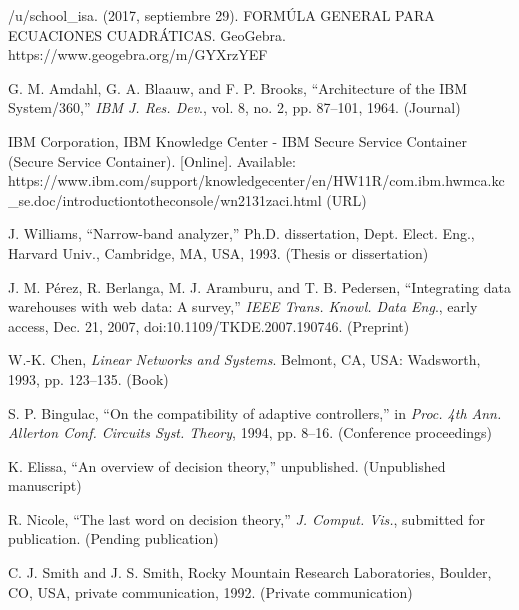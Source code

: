 \documentclass{IEEEcsmag}
\begin{document}
\begin{thebibliography}{1}

/u/school_isa. (2017, septiembre 29). FORMÚLA GENERAL PARA ECUACIONES CUADRÁTICAS. GeoGebra. https://www.geogebra.org/m/GYXrzYEF

G. M. Amdahl, G. A. Blaauw, and F. P. Brooks, ``Architecture of the IBM System/360,'' {\it IBM J. Res. Dev}., vol. 8, no. 2, pp. 87--101, 1964. (Journal)

IBM Corporation, IBM Knowledge Center - IBM Secure Service Container (Secure Service Container). [Online]. Available: {https://www.ibm.com/support/\break knowledgecenter/en/HW11R/com.ibm.hwmca.kc\_se.doc/\break introductiontotheconsole/wn2131zaci.html} (URL)

J. Williams, ``Narrow-band analyzer,'' Ph.D. dissertation, Dept.  Elect. Eng., Harvard Univ., Cambridge, MA, USA, 1993. (Thesis or dissertation)

J. M. P\'erez, R. Berlanga, M. J. Aramburu, and T. B. Pedersen, ``Integrating data warehouses with web data: A survey,'' {\it IEEE Trans. Knowl. Data Eng}., early access, Dec. 21, 2007, doi:10.1109/TKDE.2007.190746. (Preprint)

W.-K. Chen, {\it Linear Networks and Systems}. Belmont, CA, USA: Wadsworth,  1993, pp. 123--135. (Book)

S. P. Bingulac, ``On the compatibility of adaptive controllers,'' in {\it Proc. 4th Ann. Allerton Conf. Circuits Syst. Theory}, 1994,  pp. 8--16. (Conference proceedings)

K. Elissa, ``An overview of decision theory,'' unpublished. (Unpublished manuscript)

R. Nicole, ``The last word on decision theory,'' {\it J. Comput. Vis.}, submitted for publication. (Pending publication)

C. J. Smith and J. S. Smith, Rocky Mountain Research Laboratories, Boulder, CO, USA, private communication, 1992. (Private communication)
\end{thebibliography}\vspace*{-8pt}
\end{document}

